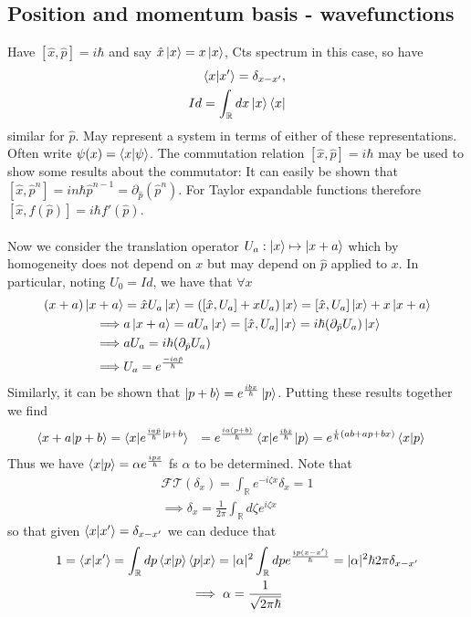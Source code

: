 \documentclass{article}
\begin{document}
\subsection{Position and momentum basis - wavefunctions}
Have $[\hat x,\hat p]=i\hbar$ and say $\hat x\ket x=x\ket x$,  Cts spectrum in this case, so have
\begin{align*}
  \braket{x|x'}=\delta_{x-x'},
  \\
  Id=\int_\mathbb{R}dx\ket x \bra x
\end{align*}
similar for $\hat p$.  May represent a system in terms of either of these representations.  Often write $\psi(x)=\braket{x|\psi}$.  The commutation relation $[\hat x,\hat p]=i\hbar$ may be used to show some results about the commutator:  It can easily be shown that $[\hat x,\hat p^n]=in\hbar \hat p^{n-1}=\partial_{\hat p}(\hat p^n)$.  For Taylor expandable functions therefore $[\hat x,f(\hat p)]=i\hbar f'(\hat p)$.
\\
\\
Now we consider the translation operator $U_a:\ket x\mapsto\ket{x+a}$ which by homogeneity does not depend on $x$ but may depend on $\hat p$ applied to $x$.  In particular, noting $U_0=Id$, we have that $\forall x$
\begin{align*}
  (x+a)\ket{x+a}&=\hat xU_a\ket x=([\hat x,U_a]+xU_a)\ket x=[\hat x,U_a]\ket x+x\ket{x+a}
  \\
  \implies& a\ket{x+a}=aU_a\ket x=[\hat x,U_a]\ket x=i\hbar(\partial_{\hat p}U_a)\ket x
  \\
  \implies& aU_a=i\hbar(\partial_{\hat p}U_a)
  \\
  \implies& U_a=e^{\frac{-ia\hat p}{\hbar}}
\end{align*}
Similarly, it can be shown that $\ket{p+b}=e^{\frac{ibx}{\hbar}}\ket{p}$.  Putting these results together we find
\begin{align*}
  \braket{x+a|p+b}&=\braket{x|e^{\frac{ia\hat p}{\hbar}|p+b}}
  &=e^{\frac{ia(p+b)}{\hbar}}\braket{x|e^{\frac{ib\hat x}{\hbar}}|p}
  &=e^{\frac{i}{\hbar}(ab+ap+bx)}\braket{x|p}
\end{align*}
Thus we have $\braket{x|p}=\alpha e^{\frac{ipx}{\hbar}}$ fs $\alpha$ to be determined.  Note that
\begin{gather*}
  \mathcal{FT}(\delta_x)=\int_{\mathbb{R}}e^{-i\zeta x}\delta_x=1
  \\
  \implies \delta_x=\frac{1}{2\pi}\int_{\mathbb{R}}d\zeta e^{i\zeta x}
\end{gather*}
so that given $\braket{x|x'}=\delta_{x-x'}$ we can deduce that
\begin{gather*}
  1=\braket{x|x'}=\int_{\mathbb{R}}dp\braket{x|p}\braket{p|x}=|\alpha|^2\int_{\mathbb R}dpe^{\frac{ip(x-x')}{\hbar}}=|\alpha|^2\hbar2\pi\delta_{x-x'}
  \\
  \implies \alpha=\frac{1}{\sqrt{2\pi\hbar}}
\end{gather*}
\end{document}
